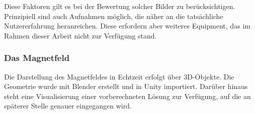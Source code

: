 Diese Faktoren gilt es bei der Bewertung solcher Bilder zu berücksichtigen. Prinzipiell sind auch Aufnahmen möglich, die näher an die tatsächliche Nutzererfahrung heranreichen. Diese erfordern aber weiteres Equipment, das im Rahmen dieser Arbeit nicht zur Verfügung stand.

\subsubsection{Das Magnetfeld}
\label{sec-5-2-2}
Die Darstellung des Magnetfeldes in Echtzeit erfolgt über 3D-Objekte. Die Geometrie wurde mit Blender erstellt und in Unity importiert.
Darüber hinaus steht eine Visualisierung einer vorberechneten Lösung zur Verfügung, auf die an späterer Stelle genauer eingegangen wird.

